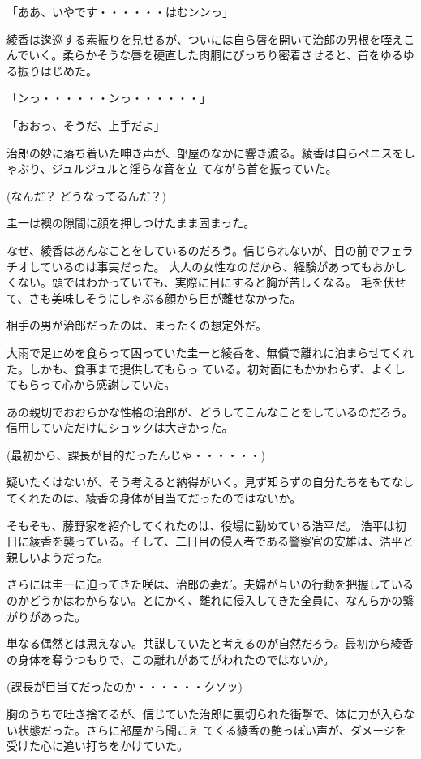 ﻿\documentclass[book,tate]{jlreq}
\begin{document}
「ああ、いやです・・・・・・はむンンっ」

綾香は逡巡する素振りを見せるが、ついには自ら唇を開いて治郎の男根を咥えこんでいく。柔らかそうな唇を硬直した肉胴にぴっちり密着させると、首をゆるゆる振りはじめた。

「ンっ・・・・・・ンっ・・・・・・」

「おおっ、そうだ、上手だよ」

治郎の妙に落ち着いた呻き声が、部屋のなかに響き渡る。綾香は自らペニスをしゃぶり、ジュルジュルと淫らな音を立 てながら首を振っていた。

(なんだ？ どうなってるんだ？)

圭一は襖の隙間に顔を押しつけたまま固まった。

なぜ、綾香はあんなことをしているのだろう。信じられないが、目の前でフェラチオしているのは事実だった。 大人の女性なのだから、経験があってもおかしくない。頭ではわかっていても、実際に目にすると胸が苦しくなる。 毛を伏せて、さも美味しそうにしゃぶる顔から目が離せなかった。

相手の男が治郎だったのは、まったくの想定外だ。

大雨で足止めを食らって困っていた圭一と綾香を、無償で離れに泊まらせてくれた。しかも、食事まで提供してもらっ ている。初対面にもかかわらず、よくしてもらって心から感謝していた。

あの親切でおおらかな性格の治郎が、どうしてこんなことをしているのだろう。信用していただけにショックは大きかった。

(最初から、課長が目的だったんじゃ・・・・・・)

疑いたくはないが、そう考えると納得がいく。見ず知らずの自分たちをもてなしてくれたのは、綾香の身体が目当てだったのではないか。

そもそも、藤野家を紹介してくれたのは、役場に勤めている浩平だ。 浩平は初日に綾香を襲っている。そして、二日目の侵入者である警察官の安雄は、浩平と親しいようだった。

さらには圭一に迫ってきた咲は、治郎の妻だ。夫婦が互いの行動を把握しているのかどうかはわからない。とにかく、離れに侵入してきた全員に、なんらかの繋がりがあった。

単なる偶然とは思えない。共謀していたと考えるのが自然だろう。最初から綾香の身体を奪うつもりで、この離れがあてがわれたのではないか。

(課長が目当てだったのか・・・・・・クソッ)

胸のうちで吐き捨てるが、信じていた治郎に裏切られた衝撃で、体に力が入らない状態だった。さらに部屋から聞こえ てくる綾香の艶っぽい声が、ダメージを受けた心に追い打ちをかけていた。
\end{document}

